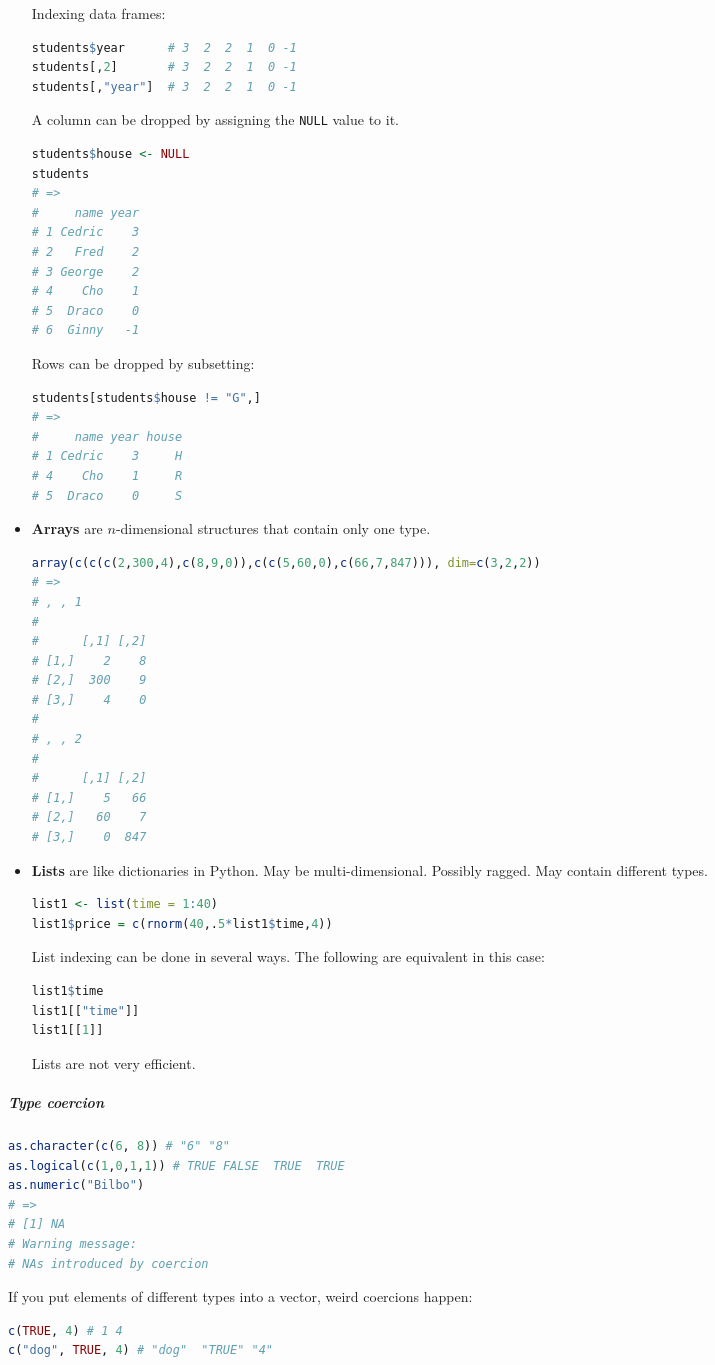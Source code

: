 \begin{itemize}
Indexing data frames:
\begin{lstlisting}[language={r}, style=snippet]
students$year      # 3  2  2  1  0 -1
students[,2]       # 3  2  2  1  0 -1
students[,"year"]  # 3  2  2  1  0 -1
\end{lstlisting}
A column can be dropped by assigning the \texttt{NULL} value to it.
\begin{lstlisting}[language={r}, style=snippet]
students$house <- NULL
students
# =>
#     name year
# 1 Cedric    3
# 2   Fred    2
# 3 George    2
# 4    Cho    1
# 5  Draco    0
# 6  Ginny   -1
\end{lstlisting}
Rows can be dropped by subsetting:
\begin{lstlisting}[language={r}, style=snippet]
students[students$house != "G",]
# =>
#     name year house
# 1 Cedric    3     H
# 4    Cho    1     R
# 5  Draco    0     S
\end{lstlisting}
\item \textbf{Arrays} are $n$-dimensional structures that contain only one type.
\begin{lstlisting}[language={r}, style=snippet]
array(c(c(c(2,300,4),c(8,9,0)),c(c(5,60,0),c(66,7,847))), dim=c(3,2,2))
# =>
# , , 1
#
#      [,1] [,2]
# [1,]    2    8
# [2,]  300    9
# [3,]    4    0
#
# , , 2
#
#      [,1] [,2]
# [1,]    5   66
# [2,]   60    7
# [3,]    0  847
\end{lstlisting}
\item \textbf{Lists} are like dictionaries in Python. May be multi-dimensional. Possibly ragged. May contain different types.
\begin{lstlisting}[language={r}, style=snippet]
list1 <- list(time = 1:40)
list1$price = c(rnorm(40,.5*list1$time,4))
\end{lstlisting}
List indexing can be done in several ways. The following are equivalent in this case:
\begin{lstlisting}[language={r}, style=snippet]
list1$time
list1[["time"]]
list1[[1]]
\end{lstlisting}
Lists are not very efficient.
\end{itemize}

\subparagraph{Type coercion}
\begin{lstlisting}[language={r}, style=snippet]
as.character(c(6, 8)) # "6" "8"
as.logical(c(1,0,1,1)) # TRUE FALSE  TRUE  TRUE
as.numeric("Bilbo")
# =>
# [1] NA
# Warning message:
# NAs introduced by coercion
\end{lstlisting}
If you put elements of different types into a vector, weird coercions happen:
\begin{lstlisting}[language={r}, style=snippet]
c(TRUE, 4) # 1 4
c("dog", TRUE, 4) # "dog"  "TRUE" "4"
\end{lstlisting}

